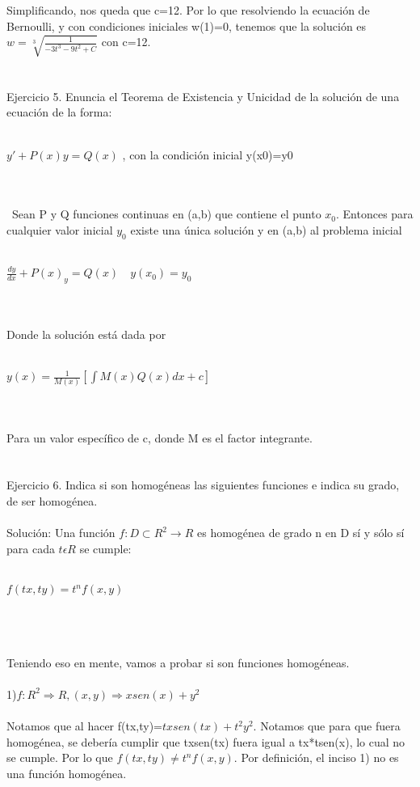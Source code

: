 \documentclass[a4paper,10pt]{article}
\begin{document}
Simplificando, nos queda que c=12. Por lo que resolviendo la ecuación de Bernoulli, y con condiciones iniciales w(1)=0, tenemos que la solución es $w= \sqrt[3]{\frac{1}{-3t^3 -9t^2  + C}}$ con c=12.\\\\\\
Ejercicio 5. Enuncia el Teorema de Existencia y Unicidad de la solución de una ecuación de la forma:\\\\
\centerline{$y'+P(x)y=Q(x)$ , con la condición inicial y(x0)=y0}\\\\\
Sean P y Q funciones continuas en (a,b) que contiene el punto $x_0$. Entonces para cualquier valor inicial $y_0$ existe una única solución y en (a,b) al problema inicial\\\\
\centerline{$\frac{dy}{dx} + P(x)_y =Q(x) \quad y(x_0)= y_0$}\\\\
Donde la solución está dada por\\\\
\centerline{$y(x)=\frac{1}{M(x)}[\int M(x) Q(x) dx + c]$}\\\\
Para un valor específico de c, donde M es el factor integrante.\\\\\\
Ejercicio 6. Indica si son homogéneas las siguientes funciones e indica su grado, de ser homogénea.\\\\
Solución: Una función $f: D \subset R^2 \rightarrow R$ es homogénea de grado n en D sí y sólo sí para cada $t \epsilon R$ se cumple:\\\\
\centerline{$f(tx, ty) = t^n f(x,y)$}\\\\\\
Teniendo eso en mente, vamos a probar si son funciones homogéneas.\\\\
1)$f: R^2 \Rightarrow R, (x,y)\Rightarrow xsen(x) + y^2 $ \\\\
Notamos que al hacer f(tx,ty)=$tx sen(tx) + t^2y^2$. Notamos que para que fuera homogénea, se debería cumplir que txsen(tx) fuera igual a tx*tsen(x), lo cual no se cumple. Por lo que $f(tx,ty)\neq t^n f(x,y)$. Por definición, el inciso 1) no es una función homogénea.\\\\
\end{document}
